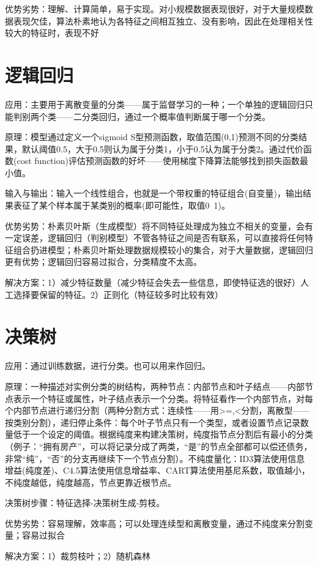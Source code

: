 \documentclass{HEBUTMaster}   %
\begin{document}
优势劣势：理解、计算简单，易于实现。对小规模数据表现很好，对于大量规模数据表现欠佳，算法朴素地认为各特征之间相互独立、没有影响，因此在处理相关性较大的特征时，表现不好

\section{逻辑回归}
应用：主要用于离散变量的分类——属于监督学习的一种；一个单独的逻辑回归只能判别两个类——二分类回归，通过一个概率值判断属于哪一个分类。

原理：模型通过定义一个sigmoid S型预测函数，取值范围(0,1)预测不同的分类结果，默认阈值0.5，大于0.5则认为属于分类1，小于0.5认为属于分类2。通过代价函数(cost function)评估预测函数的好坏——使用梯度下降算法能够找到损失函数最小值。

输入与输出：输入一个线性组合，也就是一个带权重的特征组合(自变量)，输出结果表征了某个样本属于某类别的概率(即可能性，取值0~1)。

优势劣势：朴素贝叶斯（生成模型）将不同特征处理成为独立不相关的变量，会有一定误差，逻辑回归（判别模型）不管各特征之间是否有联系，可以直接将任何特征组合扔进模型；朴素贝叶斯处理数据规模较小的集合，对于大量数据，逻辑回归更有优势；逻辑回归容易过拟合，分类精度不太高。

解决方案：1）减少特征数量（减少特征会失去一些信息，即使特征选的很好）人工选择要保留的特征。2）正则化（特征较多时比较有效）

\section{决策树}
应用：通过训练数据，进行分类。也可以用来作回归。

原理：一种描述对实例分类的树结构，两种节点：内部节点和叶子结点——内部节点表示一个特征或属性，叶子结点表示一个分类。将特征看作一个内部节点，对每个内部节点进行递归分割（两种分割方式：连续性——用>=,<分割，离散型——按类别分割），递归停止条件：每个叶子节点只有一个类型，或者设置节点记录数量低于一个设定的阈值。根据纯度来构建决策树，纯度指节点分割后有最小的分类（例子：“拥有房产”，可以将记录分成了两类，“是”的节点全部都可以偿还债务，非常“纯”，“否”的分支再继续下一个节点分割）。不纯度量化：ID3算法使用信息增益(纯度差)、C4.5算法使用信息增益率、CART算法使用基尼系数，取值越小，不纯度越低，纯度越高，节点更靠近根节点。

决策树步骤：特征选择-决策树生成-剪枝。

优势劣势：容易理解，效率高；可以处理连续型和离散变量，通过不纯度来分割变量；容易过拟合

解决方案：1）裁剪枝叶；2）随机森林
\end{document}
